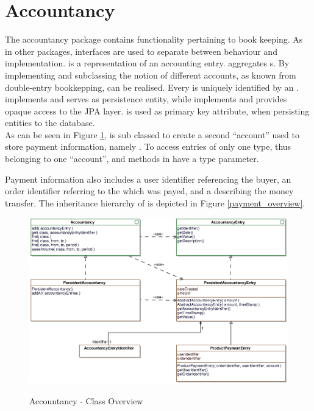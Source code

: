 \newpage
\section{Accountancy}
The accountancy package contains functionality pertaining to book keeping.
As in other packages, interfaces are used to separate between behaviour and implementation.
 is a representation of an accounting entry.
 aggregates s.
By implementing and subclassing  the notion of different accounts, as known from double-entry bookkepping, can be realised.
Every  is uniquely identified by an .
\\

 implements  and serves as persistence entity, while  implements  and provides opaque access to the JPA layer.
 is used as primary key attribute, when persisting entities to the database.
\\

As can be seen in Figure \ref{accountancy_overview},  is sub classed to create a second ``account'' used to store payment information, namely .
To access entries of only one type, thus belonging to one ``account'',  and  methods in  have a type parameter.

Payment information also includes a user identifier referencing the buyer, an order identifier referring to the  which was payed, and a  describing the money transfer.
The inheritance hierarchy of  is depicted in Figure \ref{payment_overview}.
\begin{figure}
	\centering
  \includegraphics[width=1.0\textwidth]{images/Accountancy_Overview.eps}
	\label{accountancy_overview}
	\caption{Accountancy - Class Overview}
\end{figure}

